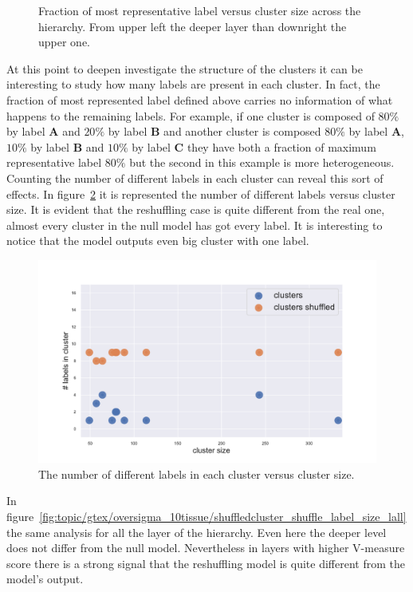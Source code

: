 \begin{figure}[htb!]
\begin{minipage}{0.45\textwidth}
	\end{minipage}
	\caption{Fraction of most representative label versus cluster size across the hierarchy. From upper left the deeper layer than downright the upper one.}
	\label{fig:topic/gtex/oversigma_10tissue/shuffledclusterhomosize_l*}
\end{figure}

At this point to deepen investigate the structure of the clusters it can be interesting to study how many labels are present in each cluster. In fact, the fraction of most represented label defined above carries no information of what happens to the remaining labels. For example, if one cluster is composed of $80\%$ by label \textbf{A} and $20\%$ by label \textbf{B} and another cluster is composed $80\%$ by label \textbf{A}, $10\%$ by label \textbf{B} and $10\%$ by label \textbf{C} they have both a fraction of maximum representative label $80\%$ but the second in this example is more heterogeneous. Counting the number of different labels in each cluster can reveal this sort of effects. In figure~\ref{fig:topic/gtex/oversigma_10tissue/shuffledcluster_shuffle_label_size_l3_primary_site} it is represented the number of different labels versus cluster size. It is evident that the reshuffling case is quite different from the real one, almost every cluster in the null model has got every label. It is interesting to notice that the model outputs even big cluster with one label.
\begin{figure}[htb!]
    \centering
    \includegraphics[width=0.9\linewidth]{pictures/topic/gtex/oversigma_10tissue/shuffledcluster_shuffle_label_size_l3_primary_site.pdf}
    \caption{The number of different labels in each cluster versus cluster size.}
    \label{fig:topic/gtex/oversigma_10tissue/shuffledcluster_shuffle_label_size_l3_primary_site}
\end{figure}
In figure~\ref{fig:topic/gtex/oversigma_10tissue/shuffledcluster_shuffle_label_size_lall} the same analysis for all the layer of the hierarchy. Even here the deeper level does not differ from the null model. Nevertheless in layers with higher V-measure score there is a strong signal that the reshuffling model is quite different from the model's output.
